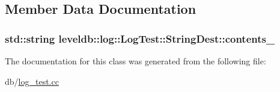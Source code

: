 \subsection{Member Data Documentation}
\hypertarget{classleveldb_1_1log_1_1_log_test_1_1_string_dest_a9a56f56d73ff14a617b2737c16e28bf4}{}
\subsubsection[{contents\+\_\+}]{\setlength{\rightskip}{0pt plus 5cm}std\+::string leveldb\+::log\+::\+Log\+Test\+::\+String\+Dest\+::contents\+\_\+}\label{classleveldb_1_1log_1_1_log_test_1_1_string_dest_a9a56f56d73ff14a617b2737c16e28bf4}


The documentation for this class was generated from the following file\+:\begin{DoxyCompactItemize}
\item 
db/\hyperlink{log__test_8cc}{log\+\_\+test.\+cc}\end{DoxyCompactItemize}
